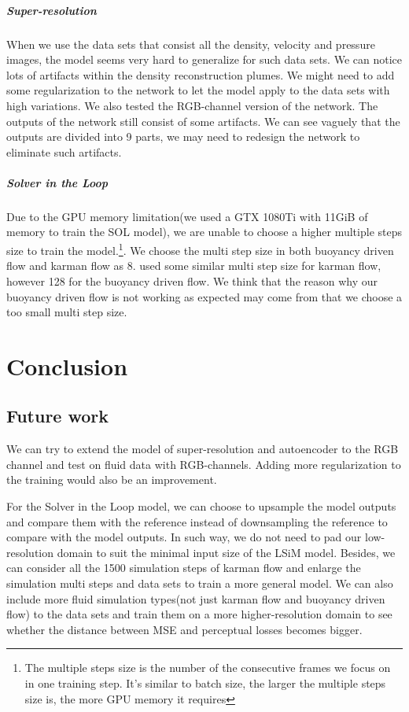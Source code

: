 \documentclass[a4paper,12pt,twoside]{report}
\begin{document}
\paragraph{Super-resolution} When we use the data sets that consist all the density, velocity and pressure images, the model seems very hard to generalize for such data sets. We can notice lots of artifacts within the density reconstruction plumes. We might need to add some regularization to the network to let the model apply to the data sets with high variations. We also tested the RGB-channel version of the network. The outputs of the network still consist of some artifacts. We can see vaguely that the outputs are divided into 9 parts, we may need to redesign the network to eliminate such artifacts.
\paragraph{Solver in the Loop}Due to the GPU memory limitation(we used a GTX 1080Ti with 11GiB of memory to train the SOL  model), we are unable to choose a higher multiple steps size to train the model.\footnote{The multiple steps size is the number of the consecutive frames we focus on in one training step. It's similar to batch size, the larger the multiple steps size is, the more GPU memory it requires}. We choose the multi step size in both buoyancy driven flow and karman flow as 8. \citeauthor{um2020sol} used some similar multi step size for karman flow, however 128 for the buoyancy driven flow. We think that the reason why our buoyancy driven flow is not working as expected may come from that we choose a too small multi step size.





\chapter{Conclusion}
\section{Future work}
We can try to extend the model of super-resolution and autoencoder to the RGB channel and test on fluid data with RGB-channels. Adding more regularization to the training would also be an improvement.

For the Solver in the Loop model, we can choose to upsample the model outputs and compare them with the reference instead of downsampling the reference to compare with the model outputs. In such way, we do not need to pad our low-resolution domain to suit the minimal input size of the LSiM model. Besides, we can consider all the 1500 simulation steps of karman flow and enlarge the simulation multi steps and data sets to train a more general model. We can also include more fluid simulation types(not just karman flow and buoyancy driven flow) to the data sets and train them on a more higher-resolution domain to see whether the distance between MSE and perceptual losses becomes bigger.
\end{document}
